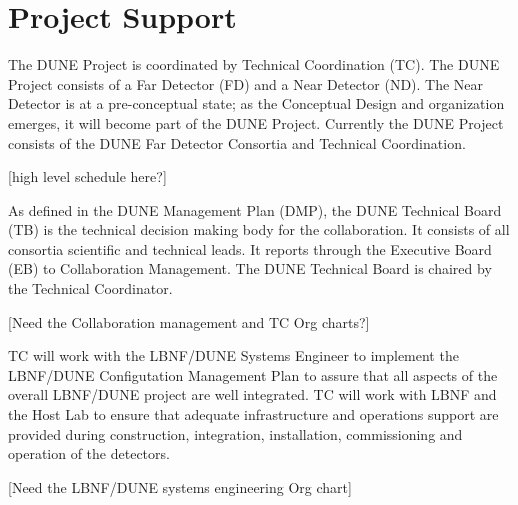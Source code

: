 \section{Project Support}
\label{sec:fdsp-coord-supp}

The DUNE Project is coordinated by Technical Coordination (TC). The
DUNE Project consists of a Far Detector (FD) and a Near Detector
(ND). The Near Detector is at a pre-conceptual state; as the
Conceptual Design and organization emerges, it will become part of the
DUNE Project. Currently the DUNE Project consists of the DUNE Far
Detector Consortia and Technical Coordination.

[high level schedule here?]

As defined in the DUNE Management Plan (DMP), the DUNE Technical Board (TB) is
the technical decision making body for the collaboration. It consists
of all consortia scientific and technical leads. It reports through
the Executive Board (EB) to Collaboration Management. The DUNE Technical
Board is chaired by the Technical Coordinator.

[Need the Collaboration management and TC Org charts?]


TC will work with the LBNF/DUNE Systems Engineer to implement the
LBNF/DUNE Configutation Management Plan to assure that all aspects of
the overall LBNF/DUNE project are well integrated. TC will work
with LBNF and the Host Lab to ensure that adequate infrastructure and
operations support are provided during construction, integration,
installation, commissioning and operation of the detectors.

[Need the LBNF/DUNE systems engineering Org chart]

